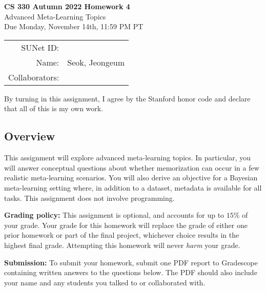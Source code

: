 \documentclass[12pt]{article}
\begin{document}
    \begin{center}
    {\Large \textbf{CS 330 Autumn 2022 Homework 4} \\
    Advanced Meta-Learning Topics
    \\
    \vspace{0.2cm}
    Due Monday, November 14th, 11:59 PM PT}

        \begin{tabular}{rl}
            SUNet ID:      &                \\
            Name:          & Seok, Jeongeum \\
            Collaborators: &
        \end{tabular}
    \end{center}

    By turning in this assignment, I agree by the Stanford honor code and declare that all of this is my own work.

    \subsection*{Overview}
    This assignment will explore advanced meta-learning topics.
    In particular, you will answer conceptual questions about whether memorization can occur in a few realistic meta-learning scenarios.
    You will also derive an objective for a Bayesian meta-learning setting where, in addition to a dataset, metadata is available for all tasks.
    This assignment does not involve programming.

    \textbf{Grading policy:} This assignment is optional, and accounts for up to $15\%$ of your grade. Your grade for this homework will replace the grade of either one prior homework or part of the final project, whichever choice results in the highest final grade. Attempting this homework will never \textit{harm} your grade.

    \textbf{Submission:} To submit your homework, submit one PDF report to Gradescope containing written answers to the questions below. The PDF should also include your name and any students you talked to or collaborated with.
\end{document}
